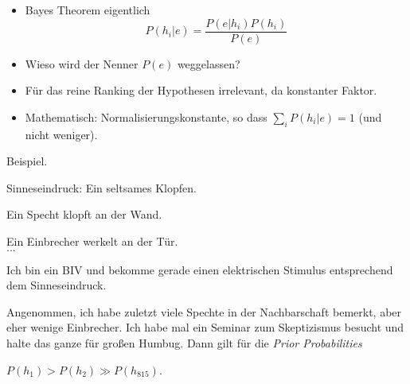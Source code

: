 \documentclass[11pt, handout]{beamer}
\begin{document}
\begin{frame}

\small

      \begin{itemize}[<+->]
      \item Bayes Theorem eigentlich
        \begin{equation*}
        P(h_i|e) = \frac{P(e|h_i)P(h_i)}{P(e)}
      \end{equation*}
      
      \item Wieso wird der Nenner $P(e)$  weggelassen?
      \item Für das reine Ranking der Hypothesen irrelevant, da konstanter Faktor.
      \item Mathematisch: Normalisierungskonstante, so dass $\sum_{i} P(h_i|e) = 1$ (und nicht weniger).
      \end{itemize}

\end{frame}

\begin{frame}
  Beispiel.
  \begin{description}[xxxxxxx]
  \item[$e$] {\small Sinneseindruck: Ein seltsames Klopfen.}
  \item[$h_1$] {\small Ein Specht klopft an der Wand.}
  \item[$h_2$] {\small Ein Einbrecher werkelt an der Tür.} \\ $...$
  \item[$h_{815}$] {\small Ich bin ein BIV und bekomme gerade einen
      elektrischen Stimulus entsprechend dem Sinneseindruck.}
  \end{description}

  {\small Angenommen, ich habe zuletzt viele Spechte in der
    Nachbarschaft bemerkt, aber eher wenige Einbrecher. Ich habe mal
    ein Seminar zum Skeptizismus besucht und halte das ganze für
    großen Humbug. Dann gilt für die \emph{Prior Probabilities}}

  \begin{center}
    $P(h_1) > P(h_2) \gg P(h_{815})$.
  \end{center}
\end{frame}
\end{document}
